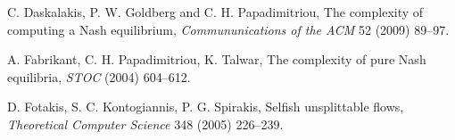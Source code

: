 \documentclass{article}
\begin{document}
\vfill

\begin{thebibliography}{99}

 C. Daskalakis, P. W. Goldberg and C. H. Papadimitriou, The complexity of computing a Nash equilibrium, \emph{Commununications of the ACM} 52 (2009) 89--97.


 A. Fabrikant, C. H. Papadimitriou, K. Talwar, The complexity of pure Nash equilibria, \emph{STOC} (2004) 604--612.

 D. Fotakis, S. C. Kontogiannis, P. G. Spirakis, Selfish unsplittable flows, \emph{Theoretical Computer Science} 348 (2005) 226--239.

\end{thebibliography}
\end{document}
